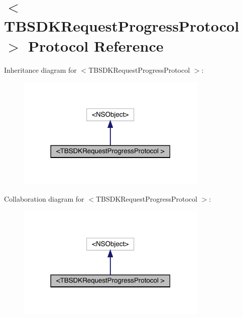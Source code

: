 \hypertarget{protocol_t_b_s_d_k_request_progress_protocol_01-p}{}\section{$<$T\+B\+S\+D\+K\+Request\+Progress\+Protocol $>$ Protocol Reference}
\label{protocol_t_b_s_d_k_request_progress_protocol_01-p}


Inheritance diagram for $<$T\+B\+S\+D\+K\+Request\+Progress\+Protocol $>$\+:\nopagebreak
\begin{figure}[H]
\begin{center}
\leavevmode
\includegraphics[width=258pt]{protocol_t_b_s_d_k_request_progress_protocol_01-p__inherit__graph}
\end{center}
\end{figure}


Collaboration diagram for $<$T\+B\+S\+D\+K\+Request\+Progress\+Protocol $>$\+:\nopagebreak
\begin{figure}[H]
\begin{center}
\leavevmode
\includegraphics[width=258pt]{protocol_t_b_s_d_k_request_progress_protocol_01-p__coll__graph}
\end{center}
\end{figure}

